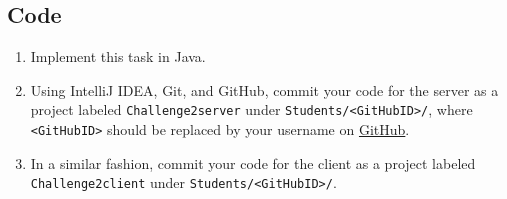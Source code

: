 \documentclass[11pt]{article}
\begin{document}
\subsection*{Code}

\begin{enumerate}
\item Implement this task in Java.
\item Using IntelliJ IDEA, Git, and GitHub, commit your code for the server as a project labeled \texttt{Challenge2server} under \texttt{Students/<GitHubID>/}, where \texttt{<GitHubID>} should be replaced by your username on \href{https://GitHub.com}{GitHub}.
\item In a similar fashion, commit your code for the client as a project labeled \texttt{Challenge2client} under \texttt{Students/<GitHubID>/}.
\end{enumerate}
\end{document}
